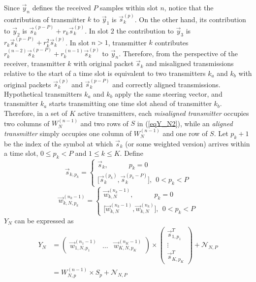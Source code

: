 \documentclass[10pt, a4paper, twocolumn]{IEEEtran}
\begin{document}
\noindent Since $\overrightarrow{y}_n$ defines the received $P$ samples within slot $n$, notice that the contribution of transmitter $k$ to $\overrightarrow{y}_1$ is $\overrightarrow{s}_k^{(p)}$. On the other hand, its contribution to $\overrightarrow{y}_2$ is $\overrightarrow{s}_k^{(p-P)} + r_k\overrightarrow{s}_k^{(p)}$. In slot $2$ the contribution to $\overrightarrow{y}_3$ is $r_k\overrightarrow{s}_k^{(p-P)} + r_k^2\overrightarrow{s}_k^{(p)}$. In slot $n>1$, transmitter $k$ contributes $r_k^{(n-2)}\overrightarrow{s}_k^{(p-P)} + r_k^{(n-1)}\overrightarrow{s}_k^{(p)}$ to $\overrightarrow{y}_n$. Therefore, from the perspective of the receiver, transmitter $k$ with original packet $\overrightarrow{s}_k$ and misaligned transmissions relative to the start of a time slot is equivalent to two transmitters $k_a$ and $k_b$ with original packets $\overrightarrow{s}_k^{(p)}$ and $\overrightarrow{s}_k^{(p-P)}$ and correctly aligned transmissions. Hypothetical transmitters $k_a$ and $k_b$ apply the same steering vector, and transmitter $k_a$ starts transmitting one time slot ahead of transmitter $k_b$. Therefore, in a set of $K$ active transmitters, each {\it misaligned transmitter} occupies two columns of $W_N^{(n-1)}$ and two rows of $S$ in (\ref{eqY_N2}), while an {\it aligned transmitter} simply occupies one column of $W_N^{(n-1)}$ and one row of $S$. Let $p_k+1$ be the index of the symbol at which $\overrightarrow{s}_k$ (or some weighted version) arrives within a time slot, $0\leq p_k<P$ and $1\leq k\leq K$. Define
\begin{equation}
\overrightarrow{s}_{k,p_k} = \begin{cases}
\overrightarrow{s}_k,\quad\quad\quad p_k = 0\\
\big[\overrightarrow{s}_k^{(p_k)},\overrightarrow{s}_k^{(p_k-P)}\big],~~0<p_k<P
\end{cases}
\end{equation}
\begin{equation}
\overrightarrow{w}_{k,N,p_k}^{(n_k-1)} = \begin{cases}
\overrightarrow{w}_{k,N}^{(n_k-1)},\quad\quad\quad p_k = 0\\
\big[\overrightarrow{w}_{k,N}^{(n_k-1)},\overrightarrow{w}_{k,N}^{(n_k)}\big],~~0<p_k<P
\end{cases}
\end{equation}
\noindent $Y_N$ can be expressed as
\begin{equation}
\label{eqY_Ndetailed2}
\begin{split}
Y_N &= \begin{pmatrix}
\overrightarrow{w}_{1,N,p_1}^{(n_1-1)} & \hdots & \overrightarrow{w}_{K,N,p_K}^{(n_K-1)}
\end{pmatrix} \times \begin{pmatrix}
\overrightarrow{s}_{1,p_1}^T\\
\vdots\\
\overrightarrow{s}_{K,p_K}^T
\end{pmatrix} + \mathcal{N}_{N,P}\\
&= W_{N,p}^{(n-1)}\times S_p + \mathcal{N}_{N,P}
\end{split}
\end{equation}
\end{document}
